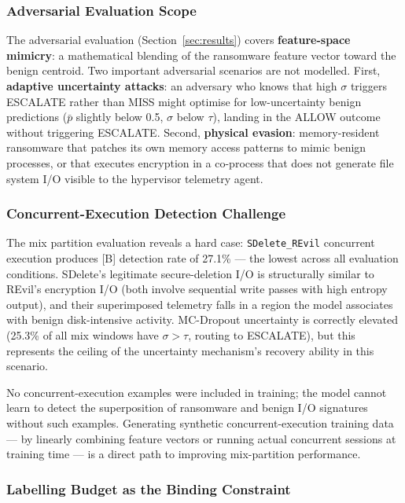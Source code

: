 \documentclass[journal]{IEEEtran}
\begin{document}
\subsubsection{Adversarial Evaluation Scope}

The adversarial evaluation (Section~\ref{sec:results}) covers \textbf{feature-space
mimicry}: a mathematical blending of the ransomware feature vector toward the benign
centroid.
Two important adversarial scenarios are not modelled.
First, \textbf{adaptive uncertainty attacks}: an adversary who knows that high $\sigma$
triggers ESCALATE rather than MISS might optimise for low-uncertainty benign predictions
($\bar{p}$ slightly below 0.5, $\sigma$ below $\tau$), landing in the ALLOW outcome
without triggering ESCALATE.
Second, \textbf{physical evasion}: memory-resident ransomware that patches its own memory
access patterns to mimic benign processes, or that executes encryption in a co-process
that does not generate file system I/O visible to the hypervisor telemetry agent.

\subsubsection{Concurrent-Execution Detection Challenge}

The mix partition evaluation reveals a hard case: \texttt{SDelete\_REvil} concurrent
execution produces [B] detection rate of 27.1\% --- the lowest across all evaluation
conditions.
SDelete's legitimate secure-deletion I/O is structurally similar to REvil's encryption I/O
(both involve sequential write passes with high entropy output), and their superimposed
telemetry falls in a region the model associates with benign disk-intensive activity.
MC-Dropout uncertainty is correctly elevated (25.3\% of all mix windows have
$\sigma > \tau$, routing to ESCALATE), but this represents the ceiling of the uncertainty
mechanism's recovery ability in this scenario.

No concurrent-execution examples were included in training; the model cannot learn to
detect the superposition of ransomware and benign I/O signatures without such examples.
Generating synthetic concurrent-execution training data --- by linearly combining feature
vectors or running actual concurrent sessions at training time --- is a direct path to
improving mix-partition performance.

\subsubsection{Labelling Budget as the Binding Constraint}
\end{document}
